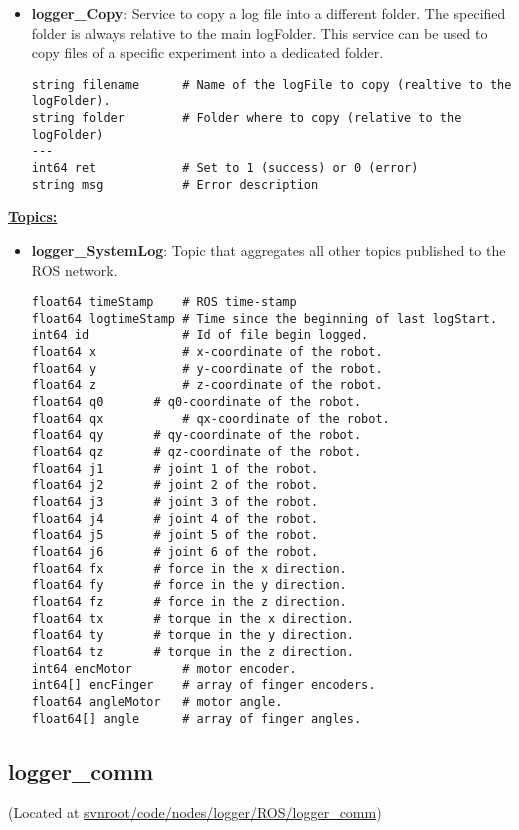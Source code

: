 \documentclass[letterpaper,notitlepage,11pt]{article}
\begin{document}
\begin{itemize}
\item \textbf{logger\_Copy}: Service to copy a log file into a
  different folder.  The specified folder is always relative to the
  main logFolder.  This service can be used to copy files of a
  specific experiment into a dedicated folder.

\begin{verbatim}
string filename      # Name of the logFile to copy (realtive to the logFolder).
string folder        # Folder where to copy (relative to the logFolder)
---
int64 ret            # Set to 1 (success) or 0 (error)
string msg           # Error description
\end{verbatim}
\end{itemize}

\textbf{\underline{Topics:}}

\begin{itemize}
\item \textbf{logger\_SystemLog}: Topic that aggregates all other
  topics published to the ROS network.

\begin{verbatim}
float64 timeStamp    # ROS time-stamp
float64 logtimeStamp # Time since the beginning of last logStart.
int64 id             # Id of file begin logged.
float64 x            # x-coordinate of the robot.
float64 y            # y-coordinate of the robot.
float64 z            # z-coordinate of the robot.
float64 q0 	     # q0-coordinate of the robot.
float64 qx           # qx-coordinate of the robot.
float64 qy	     # qy-coordinate of the robot.
float64 qz	     # qz-coordinate of the robot.
float64 j1	     # joint 1 of the robot.
float64 j2	     # joint 2 of the robot.
float64 j3	     # joint 3 of the robot.
float64 j4	     # joint 4 of the robot.
float64 j5	     # joint 5 of the robot.
float64 j6	     # joint 6 of the robot.
float64 fx	     # force in the x direction.
float64 fy	     # force in the y direction.
float64 fz	     # force in the z direction.
float64 tx	     # torque in the x direction.
float64 ty	     # torque in the y direction.
float64 tz	     # torque in the z direction.
int64 encMotor	     # motor encoder.
int64[] encFinger    # array of finger encoders.
float64 angleMotor   # motor angle.
float64[] angle	     # array of finger angles.
\end{verbatim}

\end{itemize}


\subsection{logger\_comm}
\noindent (Located at \url{svnroot/code/nodes/logger/ROS/logger_comm})
\end{document}
